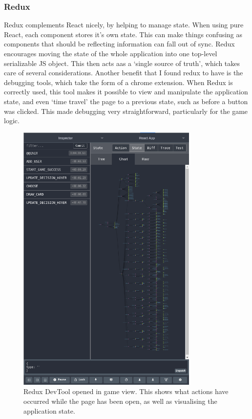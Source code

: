 \subsubsection{Redux}
Redux\cite{Redux} complements React nicely, by helping to manage state. When using pure React, each component stores it's own state. This can make things confusing as components that should be reflecting information can fall out of sync. Redux encourages moving the state of the whole application into one top-level serializable JS object. This then acts aas a `single source of truth', which takes care of several considerations. Another benefit that I found redux to have is the debugging tools, which take the form of a chrome extension\cite{ReduxDev}. When Redux is correctly used, this tool makes it possible to view and manipulate the application state, and even `time travel' the page to a previous state, such as before a button was clicked. This made debugging very straightforward, particularly for the game logic.

\begin{figure}[!h]
	\centering
	\includegraphics[width=0.8\textwidth]{./images/impl/redux_view.png}
	\caption{Redux DevTool\cite{ReduxDev} opened in game view. This shows what actions have occurred while the page has been open, as well as visualising the application state.}
	\label{fig:redux_view}
\end{figure}

